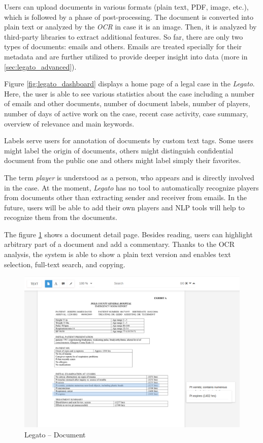 \documentclass[
  digital, %
  notable,   %
  nolof,     %
  nolot,     %
]{fithesis3}
\begin{document}
Users can upload documents in various formats (plain text, PDF, image, etc.), which is followed by a phase of post-processing.
The document is converted into plain text or analyzed by the \textit{OCR} in case it is an image.
Then, it is analyzed by third-party libraries to extract additional features.
So far, there are only two types of documents: emails and others.
Emails are treated specially for their metadata and are further utilized to provide deeper insight into data (more in \ref{sec:legato_advanced}).

Figure \ref{fig:legato_dashboard} displays a home page of a legal case in the \textit{Legato}.
Here, the user is able to see various statistics about the case including a number of emails and other documents, number of document labels, number of players, number of days of active work on the case, recent case activity, case summary, overview of relevance and main keywords.

Labels serve users for annotation of documents by custom text tags.
Some users might label the origin of documents, others might distinguish confidential document from the public one and others might label simply their favorites.

The term \textit{player} is understood as a person, who appears and is directly involved in the case.
At the moment, \textit{Legato} has no tool to automatically recognize players from documents other than extracting sender and receiver from emails.
In the future, users will be able to add their own players and NLP tools will help to recognize them from the documents.

The figure \ref{fig:legato_document} shows a document detail page.
Besides reading, users can highlight arbitrary part of a document and add a commentary.
Thanks to the OCR analysis, the system is able to show a plain text version and enables text selection, full-text search, and copying.


\begin{figure}[h]
\caption{Legato -- Document}
\label{fig:legato_document}
\includegraphics[width=\textwidth]{img/Legato-File}
\end{figure}
\end{document}
